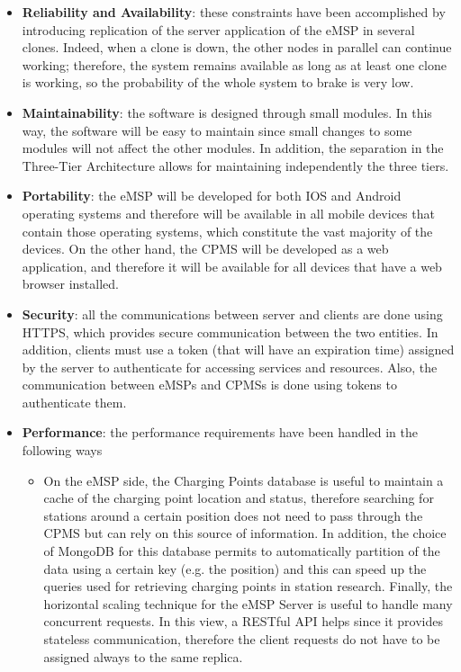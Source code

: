 \documentclass{Configuration_Files/PoliMi3i_thesis}
\begin{document}
\begin{itemize}
    \item \textbf{Reliability and Availability}: these constraints have been accomplished by introducing replication of the server application of the eMSP in several clones. Indeed, when a clone is down, the other nodes in parallel can continue working; therefore, the system remains available as long as at least one clone is working, so the probability of the whole system to brake is very low.
    \item \textbf{Maintainability}: the software is designed through small modules. In this way, the software will be easy to maintain since small changes to some modules will not affect the other modules. In addition, the separation in the Three-Tier Architecture allows for maintaining independently the three tiers.
    \item \textbf{Portability}: the eMSP will be developed for both IOS and Android operating systems and therefore will be available in all mobile devices that contain those operating systems, which constitute the vast majority of the devices. On the other hand, the CPMS will be developed as a web application, and therefore it will be available for all devices that have a web browser installed.
    \item \textbf{Security}: all the communications between server and clients are done using HTTPS, which provides secure communication between the two entities. In addition, clients must use a token (that will have an expiration time) assigned by the server to authenticate for accessing services and resources. Also, the communication between eMSPs and CPMSs is done using tokens to authenticate them.
    \item \textbf{Performance}: the performance requirements have been handled in the following ways
        \begin{itemize}
            \item On the eMSP side, the Charging Points database is useful to maintain a cache of the charging point location and status, therefore searching for stations around a certain position does not need to pass through the CPMS but can rely on this source of information. In addition, the choice of MongoDB for this database permits to automatically partition of the data using a certain key (e.g. the position) and this can speed up the queries used for retrieving charging points in station research. Finally, the horizontal scaling technique for the eMSP Server is useful to handle many concurrent requests. In this view, a RESTful API helps since it provides stateless communication, therefore the client requests do not have to be assigned always to the same replica.

\end{itemize}
\end{itemize}
\end{document}
